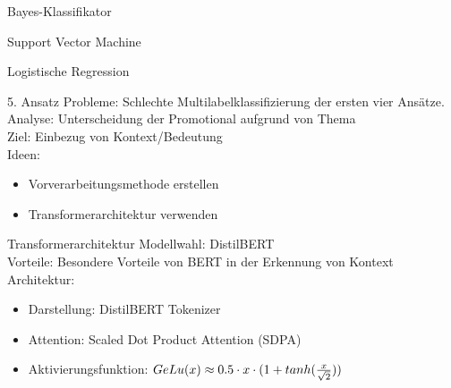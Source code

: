 \documentclass[aspectratio=169]{beamer} %
\begin{document}
\begin{frame}{Bayes-Klassifikator}
    
\end{frame}

\begin{frame}{Support Vector Machine}
    
\end{frame}

\begin{frame}{Logistische Regression}
    
\end{frame}

\begin{frame}
    \begin{block}{5. Ansatz}
      Probleme: Schlechte Multilabelklassifizierung der ersten vier Ansätze.
      \\Analyse: Unterscheidung der Promotional aufgrund von Thema
      \\Ziel:
      Einbezug von Kontext/Bedeutung
      \\Ideen:
      \begin{itemize}
      \item Vorverarbeitungsmethode erstellen
      \item Transformerarchitektur verwenden
      \end{itemize}      
    \end{block}
 
\end{frame}

\begin{frame}
    \begin{block}{Transformerarchitektur}
     Modellwahl: DistilBERT \\
     Vorteile: Besondere Vorteile von BERT in der Erkennung von Kontext
     \\Architektur:
\begin{itemize}
	\item Darstellung: DistilBERT Tokenizer
     \item Attention: Scaled Dot Product Attention (SDPA)
     \item Aktivierungsfunktion: $GeLu(x) \approx {0.5 \cdot x \cdot (1+ tanh{({x \over {\sqrt{2}}})})} $
     
\end{itemize}        
    \end{block}
 
\end{frame}
\end{document}
